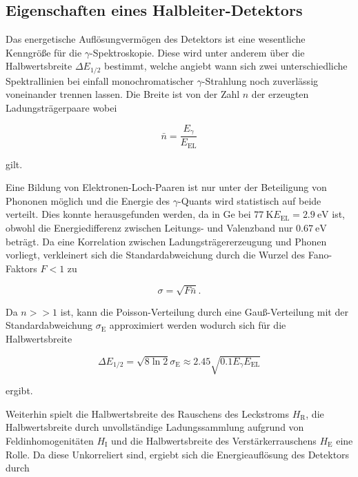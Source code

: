 \FloatBarrier
\subsection{Eigenschaften eines Halbleiter-Detektors} %
\label{sec:eigenschaften_eines_halbleiter_detektors}

Das energetische Auflösungvermögen des Detektors ist eine wesentliche Kenngröße für die $\gamma$-Spektroskopie.
Diese wird unter anderem über die Halbwertsbreite $\Delta E_\text{1/2}$ bestimmt, welche angiebt wann sich zwei unterschiedliche Spektrallinien bei einfall monochromatischer $\gamma$-Strahlung noch zuverlässig voneinander trennen lassen.
Die Breite ist von der Zahl $n$ der erzeugten Ladungsträgerpaare wobei

\begin{equation}
	\bar{n} = \frac{E_\gamma}{E_\text{EL}}
\end{equation}

gilt.

Eine Bildung von Elektronen-Loch-Paaren ist nur unter der Beteiligung von Phononen möglich und die Energie des $\gamma$-Quants wird statistisch auf beide verteilt.
Dies konnte herausgefunden werden, da in Ge bei $\SI{77}{\kelvin} E_\text{EL} = \SI{2.9}{\electronvolt}$ ist, obwohl die Energiedifferenz zwischen Leitungs- und Valenzband nur $\SI{0.67}{\electronvolt}$ beträgt.
Da eine Korrelation zwischen Ladungsträgererzeugung und Phonen vorliegt, verkleinert sich die Standardabweichung durch die Wurzel des Fano-Faktors $F < 1$ zu

\begin{equation}
	\sigma = \sqrt{F \bar{n}} .
\end{equation}

Da $n >> 1$ ist, kann die Poisson-Verteilung durch eine Gauß-Verteilung mit der Standardabweichung $\sigma_\text{E}$ approximiert werden wodurch sich für die Halbwertsbreite

\begin{equation}
	\Delta E_\text{1/2} = \sqrt{8 \ln{2}} \sigma_\text{E} \approx 2.45 \sqrt{0.1 E_\text{$\gamma$} E_\text{EL}}
\end{equation}

ergibt.

Weiterhin spielt die Halbwertsbreite des Rauschens des Leckstroms $H_\text{R}$, die Halbwertsbreite durch unvollständige Ladungssammlung aufgrund von Feldinhomogenitäten $H_\text{I}$ und die Halbwertsbreite des Verstärkerrauschens $H_\text{E}$ eine Rolle.
Da diese Unkorreliert sind, ergiebt sich die Energieauflösung des Detektors durch

